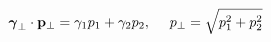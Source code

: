 \begin{equation}
 \mbox{\boldmath $\gamma$}_{\perp} \cdot {\bf p}_{\perp}= \gamma_{1} p_{1} +
\gamma_{2} p_{2}, ~~~~ p_{\perp} = \sqrt{p_{1}^{2} + p_{2}^{2}}           
\end{equation}

